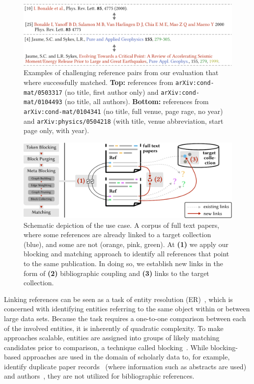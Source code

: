 \begin{figure}[tb]
  \centering
  \includegraphics[width=\linewidth]{figures/ref_covgran/hardmatch_examples.pdf}
  \caption[Examples of challenging reference pairs from our evaluation that where successfully matched]{Examples of challenging reference pairs from our evaluation that where successfully matched. \textbf{Top:} references from \texttt{arXiv:cond-mat/0503317} (no title, first author only) and \texttt{arXiv:cond-mat/0104493} (no title, all authors). \textbf{Bottom:} references from \texttt{arXiv:cond-mat/0104341} (no title, full venue, page rage, no year) and \texttt{arXiv:physics/0504218} (with title, venue abbreviation, start page only, with year).}
  \label{fig:hardmatch}
\end{figure}

\begin{figure}[tb]
  \centering
  \includegraphics[width=\linewidth]{figures/ref_covgran/approach_withblocking_10pvar.pdf}
  \caption[Schematic depiction of the use case]{Schematic depiction of the use case. A corpus of full text papers, where some references are already linked to a target collection (blue), and some are not (orange, pink, green). At \textbf{(1)} we apply our blocking and matching approach to identify all references that point to the same publication. In doing so, we establish new links in the form of \textbf{(2)} bibliographic coupling and \textbf{(3)} links to the target collection.}
  \label{fig:approach}
\end{figure}

Linking references can be seen as a task of entity resolution (ER)~\cite{Christophides2015ERdef}, which is concerned with identifying entities referring to the same object within or between large data sets. Because the task requires a one-to-one comparison between each of the involved entities, it is inherently of quadratic complexity. To make approaches scalable, entities are assigned into groups of likely matching candidates prior to comparison, a technique called blocking~\cite{Papadakis2020survey}.
While blocking-based approaches are used in the domain of scholarly data to, for example, identify duplicate paper records~\cite{Simonini2016blast,Sefid2019,Lo2020} (where information such as abstracts are used) and authors~\cite{FaerberLin2022}, they are not utilized for bibliographic references.

